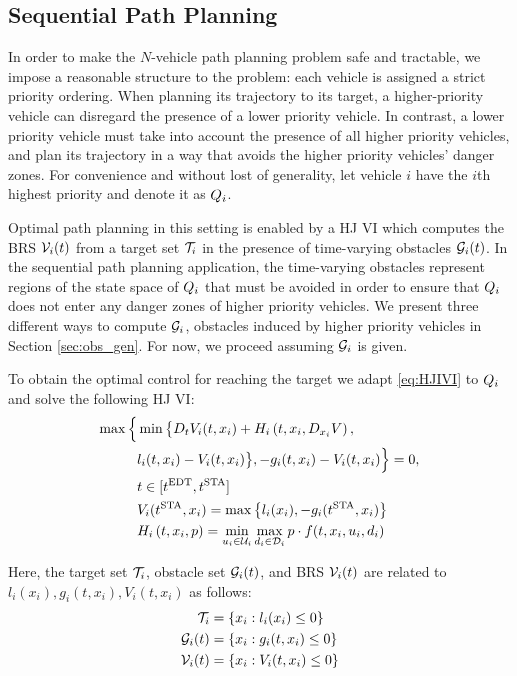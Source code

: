 \subsection{Sequential Path Planning}
In order to make the $N$-vehicle path planning problem safe and tractable, we impose a reasonable structure to the problem: each vehicle is assigned a strict priority ordering. When planning its trajectory to its target, a higher-priority vehicle can disregard the presence of a lower priority vehicle. In contrast, a lower priority vehicle must take into account the presence of all higher priority vehicles, and plan its trajectory in a way that avoids the higher priority vehicles' danger zones. For convenience and without lost of generality, let vehicle $i$ have the $i$th highest priority and denote it as $Q_i$.

Optimal path planning in this setting is enabled by a HJ VI which computes the BRS $\mathcal{V}_i(t)$ from a target set $\mathcal{T}_i$ in the presence of time-varying obstacles $\mathcal{G}_i(t)$. In the sequential path planning application, the time-varying obstacles represent regions of the state space of $Q_i$ that must be avoided in order to ensure that $Q_i$ does not enter any danger zones of higher priority vehicles. We present three different ways to compute $\mathcal{G}_i$, obstacles induced by higher priority vehicles in Section \ref{sec:obs_gen}. For now, we proceed assuming $\mathcal{G}_i$ is given.

To obtain the optimal control for reaching the target we adapt \eqref{eq:HJIVI} to $Q_i$ and solve the following HJ VI:
%
\begin{equation}
\label{eq:HJIVI_i}
\begin{aligned}
\max\Big\{&\min\big\{D_t V_i(t, x_i) + H_i\left(t, x_i, D_{x_i} V\right),\\
& l_i(t, x_i) - V_i(t, x_i)\big\}, -g_i(t, x_i) - V_i(t, x_i)\Big\} = 0, \\
& t \in [t^\text{EDT}, t^\text{STA}]\\
&V_i(t^\text{STA}, x_i) = \max\big\{l_i(x_i), -g_i(t^\text{STA}, x_i)\big\} \\
&H_i\left(t, x_i, p\right) = \min_{u_i \in \mathcal{U}_i} \max_{d_i \in \mathcal{D}_i} p \cdot f(t, x_i, u_i, d_i)
\end{aligned}
\end{equation}

Here, the target set $\mathcal{T}_i$, obstacle set $\mathcal{G}_i(t)$, and BRS $\mathcal{V}_i(t)$ are related to $l_i(x_i), g_i(t, x_i), V_i(t, x_i)$ as follows:
%
\begin{equation}
\begin{aligned}
\mathcal{T}_i &= \{x_i: l_i(x_i) \le 0\} \\
\mathcal{G}_i(t) &= \{x_i: g_i(t, x_i) \le 0\} \\
\mathcal{V}_i(t) &= \{x_i: V_i(t, x_i) \le 0\}
\end{aligned}
\end{equation}

